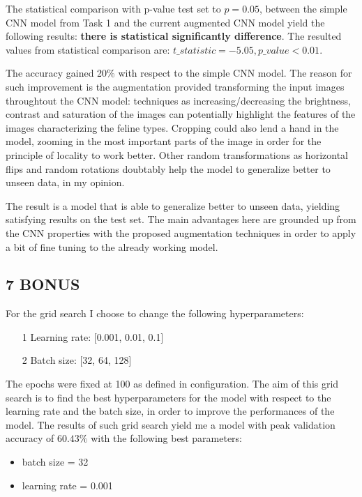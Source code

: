 \documentclass[11pt]{scrartcl}
\begin{document}
The statistical comparison with p-value test set to 
\( p = 0.05 \),
between the simple CNN model from Task 1 and the current augmented CNN model yield 
the following results:
\textbf{there is statistical significantly difference}.
The resulted values from statistical comparison are:
\( t\_statistic = -5.05, p\_value < 0.01 \).

The accuracy gained 20\% with respect to the simple CNN model.
The reason for such improvement is the augmentation provided
transforming the input images throughtout the CNN model:
techniques as increasing/decreasing the brightness, contrast and saturation 
of the images can potentially highlight the features of the images 
characterizing the feline types.
Cropping could also lend a hand in the model, 
zooming in the most important parts of the image
in order for the principle of locality to work better.
Other random transformations as horizontal flips and random rotations
doubtably help the model to generalize better to unseen data, in my opinion.

The result is a model that is able to generalize better to unseen data,
yielding satisfying results on the test set.
The main advantages here are grounded up from the CNN properties 
with the proposed augmentation techniques in order to apply a bit of fine tuning to the already 
working model.


\subsection*{7 BONUS}

For the grid search I choose to change the following hyperparameters:
\begin{itemize}
	\item[1] Learning rate: [0.001, 0.01, 0.1]
	\item[2] Batch size: [32, 64, 128]
\end{itemize}

The epochs were fixed at 100 as defined in configuration.
The aim of this grid search is to find the best hyperparameters for the model
with respect to the learning rate and the batch size, 
in order to improve the performances of the model.
The results of such grid search yield me a model with peak validation accuracy of
\( 60.43 \% \)
with the following best parameters:

\begin{itemize}
	\item batch size = 32
	\item learning rate = 0.001
\end{itemize}
\end{document}
